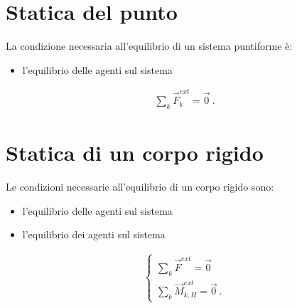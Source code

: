 \documentclass[letterpaper,10pt,italian]{jupyterBook}
\begin{document}
\section{Statica del punto}
\label{\detokenize{ch/mechanics/statics-point:statica-del-punto}}\label{\detokenize{ch/mechanics/statics-point:physics-hs-mechanics-statics-point}}\label{\detokenize{ch/mechanics/statics-point::doc}}
\sphinxAtStartPar
La condizione necessaria all’equilibrio di un sistema puntiforme è:
\begin{itemize}
\item {} 
\sphinxAtStartPar
l’equilibrio  delle  agenti sul sistema

\end{itemize}
\begin{equation*}
\begin{split}\sum_k \vec{F}^{ext}_k = \vec{0} \ .\end{split}
\end{equation*}
\sphinxstepscope


\section{Statica di un corpo rigido}
\label{\detokenize{ch/mechanics/statics-rigid:statica-di-un-corpo-rigido}}\label{\detokenize{ch/mechanics/statics-rigid:physics-hs-mechanics-statics-rigid}}\label{\detokenize{ch/mechanics/statics-rigid::doc}}
\sphinxAtStartPar
Le condizioni necessarie all’equilibrio di un corpo rigido sono:
\begin{itemize}
\item {} 
\sphinxAtStartPar
l’equilibrio  delle  agenti sul sistema

\item {} 
\sphinxAtStartPar
l’equilibrio  dei  agenti sul sistema

\end{itemize}
\begin{equation*}
\begin{split}\begin{cases}
  \sum_k \vec{F}^{ext} = \vec{0} \\
  \sum_k \vec{M}^{ext}_{k,H} = \vec{0} \ .  
\end{cases}\end{split}
\end{equation*}
\end{document}
